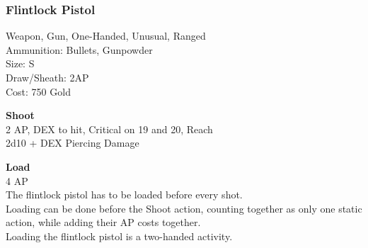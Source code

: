\subsubsection{Flintlock Pistol}\label{weapon:flintlockPistol}
Weapon, Gun, One-Handed, Unusual, Ranged\\
Ammunition: Bullets, Gunpowder\\
Size: S\\
Draw/Sheath: 2AP\\
Cost: 750 Gold

\textbf{Shoot} \\
2 AP, DEX to hit, Critical on 19 and 20,  Reach\\
2d10 + DEX Piercing Damage

\textbf{Load} \\
4 AP\\
The flintlock pistol has to be loaded before every shot.\\
Loading can be done before the Shoot action, counting together as only one static action, while adding their AP costs together.\\
Loading the flintlock pistol is a two-handed activity.
